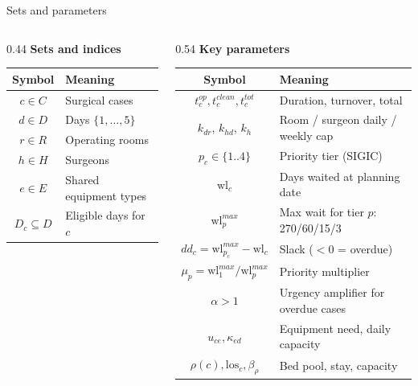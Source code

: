 \documentclass[10pt,aspectratio=169]{beamer}
\begin{document}
\begin{frame}{Sets and parameters}
  \begin{columns}
    \begin{column}{0.44\textwidth}
      \textbf{Sets and indices}\vspace{0.2em}
      \begin{center}\footnotesize
      \begin{tabular}{cl}
        \toprule
        Symbol & Meaning \\
        \midrule
        $c\in C$ & Surgical cases \\
        $d\in D$ & Days $\{1,\dots,5\}$ \\
        $r\in R$ & Operating rooms \\
        $h\in H$ & Surgeons \\
        $e\in E$ & Shared equipment types \\
        $D_c\subseteq D$ & Eligible days for $c$ \\
        \bottomrule
      \end{tabular}
      \end{center}
    \end{column}
    \begin{column}{0.54\textwidth}
      \textbf{Key parameters}\vspace{0.2em}
      \begin{center}\footnotesize
      \begin{tabular}{cl}
        \toprule
        Symbol & Meaning \\
        \midrule
        $t_c^{op},t_c^{clean},t_c^{tot}$ & Duration, turnover, total \\
        $k_{dr}$, $k_{hd}$, $k_h$ & Room / surgeon daily / weekly cap \\
        $p_c\in\{1..4\}$ & Priority tier (SIGIC) \\
        $\text{wl}_c$ & Days waited at planning date \\
        $\text{wl}^{max}_p$ & Max wait for tier $p$: 270/60/15/3 \\
        $dd_c = \text{wl}^{max}_{p_c}-\text{wl}_c$ & Slack ($<0$ = overdue) \\
        $\mu_p = \text{wl}^{max}_1/\text{wl}^{max}_p$ & Priority multiplier \\
        $\alpha>1$ & Urgency amplifier for overdue cases \\
        $u_{ce},\kappa_{ed}$ & Equipment need, daily capacity \\
        $\rho(c),\text{los}_c,\beta_\rho$ & Bed pool, stay, capacity \\

\end{tabular}
\end{center}
\end{column}
\end{columns}
\end{frame}
\end{document}
